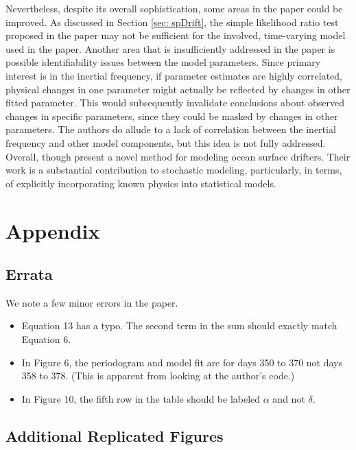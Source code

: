 \documentclass{stat572Style}
\begin{document}
Nevertheless, despite its overall sophistication, some areas in the paper could be improved. 
As discussed in Section \ref{sec: spDrift}, the simple likelihood ratio test proposed in the paper may not be sufficient for the involved, time-varying model used in the paper.  
Another area that is insufficiently addressed in the paper is possible identifiability issues between the model parameters. 
Since primary interest is in the inertial frequency, if parameter estimates are highly correlated, physical changes in one parameter might actually be reflected by changes in other fitted parameter.
 This would subsequently invalidate conclusions about observed changes in specific parameters, since they could be masked by changes in other parameters. 
 The authors do allude to a lack of correlation between the inertial frequency and other model components, but this idea is not fully addressed.
Overall, though \citet{Sykulski2016} present a novel method for modeling ocean surface drifters.
 Their work is a substantial contribution to stochastic modeling, particularly, in terms, of explicitly incorporating known physics into statistical models. 




\clearpage




\section{Appendix}

\subsection{Errata}
We note a few minor errors in the paper.
\begin{itemize}
\item Equation 13 has a typo. The second term in the sum should exactly match Equation 6. 
\item In Figure 6, the periodogram and model fit are for days 350 to 370 not days 358 to 378. (This is apparent from looking at the author's code.)
\item In Figure 10, the fifth row in the table should be labeled $\alpha$ and not $\delta$.
\end{itemize} 

\subsection{Additional Replicated Figures}
\end{document}
